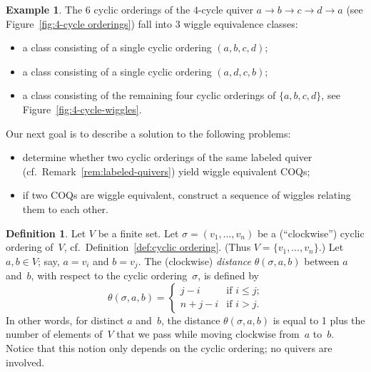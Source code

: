 \documentclass[11pt, letterpaper]{amsart}
\theoremstyle{definition}
\newtheorem{example}[theorem]{Example}
\newtheorem{definition}[theorem]{Definition}
\numberwithin{equation}{section}
\begin{document}

\begin{example}
\label{eg:6-orderings-D4}
The $6$ cyclic orderings of the $4$-cycle quiver $a \rightarrow b \rightarrow c \rightarrow d \rightarrow a$ 
(see Figure~\ref{fig:4-cycle orderings}) fall into $3$ wiggle equivalence classes: 
\begin{itemize}
\item a class consisting of a single cyclic ordering $(a, b, c, d)$; 
\item a class consisting of a single cyclic ordering $(a, d, c, b)$;
\item a class consisting of the remaining four cyclic orderings of $\{a,b,c,d\}$, see Figure~\ref{fig:4-cycle-wiggles}.
\end{itemize}
\end{example}

Our next goal is to describe a solution to the following problems: 
\begin{itemize}[leftmargin=.2in]
\item 
determine whether 
two cyclic orderings of the same labeled quiver (cf.\ Remark~\ref{rem:labeled-quivers}) 
yield wiggle equivalent COQs; 
\item
if two COQs are wiggle equivalent,
construct a sequence of wiggles relating them to each other.
\end{itemize}
%
%

\begin{definition}
\label{def:dist and winding number}
Let $V$ be a finite set.
Let $\sigma=(v_1,\dots,v_n)$ be a (``clockwise'') cyclic ordering of~$V$, cf.\ Definition~\ref{def:cyclic ordering}.
(Thus $V\!=\!\{v_1,\dots,v_n\}$.)  
Let~$a,b\in V$; say, $a\!=\!v_i$ and $b\!=\!v_j$. 
The (clock\-wise) \emph{distance} $\theta(\sigma, a, b)$ between $a$ and~$b$,  
with respect to the cyclic ordering~$\sigma$, is defined by 
\begin{equation*}
\theta(\sigma, a, b) = 
\begin{cases}
j-i & \text{if $i\le j$;} \\
n+j-i & \text{if $i>j$.}
\end{cases}
\end{equation*} 
In other words, for distinct $a$ and~$b$, the distance $\theta(\sigma, a, b)$ is equal to 
1 plus the number of elements of~$V$ that we pass while moving clockwise from~$a$ to~$b$.
Notice that this notion only depends on the cyclic ordering; no quivers are involved. 
\end{definition}
\end{document}
